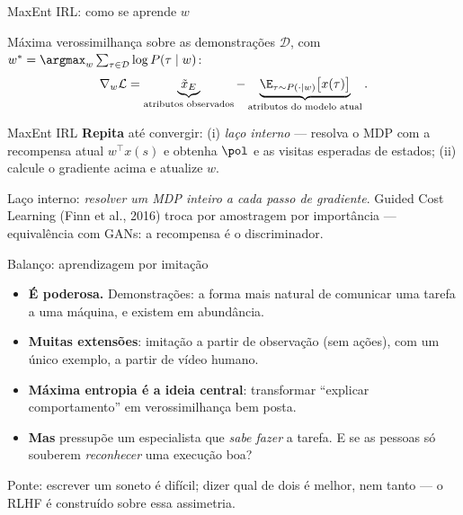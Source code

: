 \documentclass[aspectratio=169, 11pt]{beamer}
\newcommand{\Dset}{\mathcal{D}}
\newcommand{\traj}{\tau}
\begin{document}
\begin{frame}{MaxEnt IRL: como se aprende $w$}

  Máxima verossimilhança sobre as demonstrações $\Dset$, com
  $w^{*} = \argmax_{w} \sum_{\traj \in \Dset} \log P(\traj\mid w)$:
  \[
    \nabla_w \mathcal{L} = \underbrace{\tilde{x}_{E}}_{\text{atributos observados}}
      - \underbrace{\E_{\traj \sim P(\cdot\mid w)}\bigl[x(\traj)\bigr]}_{\text{atributos do modelo atual}} .
  \]

  \begin{algbox}{MaxEnt IRL}
    {\footnotesize
    \textbf{Repita} até convergir: (i) \emph{laço interno} --- resolva o MDP com
    a recompensa atual $w^{\!\top}x(s)$ e obtenha $\pol$ e as visitas esperadas
    de estados; (ii) calcule o gradiente acima e atualize $w$.}
  \end{algbox}

  \begin{alertabox}
    Laço interno: \emph{resolver um MDP inteiro a cada passo de gradiente}.
    Guided Cost Learning (Finn et al., 2016) troca por amostragem por
    importância --- equivalência com GANs: a recompensa é o discriminador.
  \end{alertabox}
\end{frame}

\begin{frame}{Balanço: aprendizagem por imitação}

  \begin{itemize}\setlength{\itemsep}{0.4ex}
    \item \textbf{É poderosa.} Demonstrações: a forma mais natural de
      comunicar uma tarefa a uma máquina, e existem em abundância.
    \item \textbf{Muitas extensões}: imitação a partir de observação (sem
      ações), com um único exemplo, a partir de vídeo humano.
    \item \textbf{Máxima entropia é a ideia central}: transformar
      ``explicar comportamento'' em verossimilhança bem posta.
    \item \textbf{Mas} pressupõe um especialista que \emph{sabe fazer} a
      tarefa. E se as pessoas só souberem \emph{reconhecer} uma execução boa?
  \end{itemize}

  \begin{ideiabox}
    Ponte: escrever um soneto é difícil; dizer qual de dois é melhor, nem
    tanto --- o RLHF é construído sobre essa assimetria.
  \end{ideiabox}
\end{frame}
\end{document}
